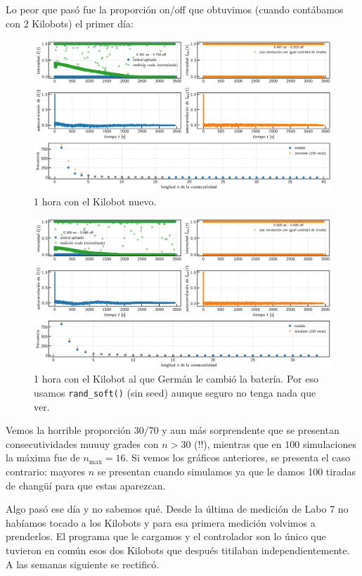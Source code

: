 \documentclass[a4paper]{article}
\begin{document}
Lo peor que pasó fue la proporción on/off que obtuvimos (cuando contábamos con 2 Kilobots) el primer día:

\begin{figure}[!h]
	\centering
	\includegraphics[width=\linewidth]{Resultados/1h_soft.png}
	\caption{1 hora con el Kilobot nuevo.}
	\label{fig:1hora_soft}
\end{figure}

\begin{figure}[!h]
	\centering
	\includegraphics[width=\linewidth]{Resultados/1h_hard.png}
	\caption{1 hora con el Kilobot al que Germán le cambió la batería. Por eso usamos \texttt{rand\_soft()} (sin seed) aunque seguro no tenga nada que ver.}
	\label{fig:1hora_hard}
\end{figure}

Vemos la horrible proporción 30/70 y aun más sorprendente que se presentan consecutividades muuuy grades con $n>30$ (!!), mientras que en $100$ simulaciones la máxima fue de $n_\mathrm{max} = 16$.
Si vemos los gráficos anteriores, se presenta el caso contrario: mayores $n$ se presentan cuando simulamos ya que le damos 100 tiradas de changüí para que estas aparezcan.

Algo pasó ese día y no sabemos qué.
Desde la última de medición de Labo 7 no habíamos tocado a los Kilobots y para esa primera medición volvimos a prenderlos.
El programa que le cargamos y el controlador son lo único que tuvieron en común esos dos Kilobots que después titilaban independientemente.
A las semanas siguiente se rectificó.
\end{document}
